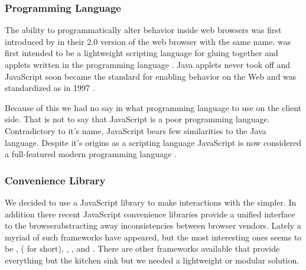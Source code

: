 \subsubsection{Programming Language}

The ability to programmatically alter behavior inside web browsers was first
introduced by  in their 2.0 version of the web browser
with the same name.  was first intended to be a
lightweight scripting language for gluing together  and applets
written in the  programming language \citep{netscape95}.%
Java applets never took off and JavaScript soon became the 
standard for enabling behavior on the Web and was standardized as
 in 1997 \citep{ecma99}.

Because of this we had no say in what programming language to use on the
client side. That is not to say that JavaScript is a poor programming
language. Contradictory to it's name, JavaScript bears few similarities to the
Java language.%
Despite it's origins as a scripting language JavaScript is now considered
a full-featured modern programming language
.

\subsubsection{Convenience Library}

We decided to use a JavaScript library to make interactions with the
 simpler.
In addition there recent JavaScript convenience libraries provide a
unified interface to the browser\dash{}abstracting away inconsistencies
between browser vendors. Lately a myriad of such frameworks have appeared,
but the most interesting ones seems to be
,
 ( for short),
,
, and
.%
There are other frameworks available that provide everything but the kitchen
sink but we needed a lightweight or modular solution.

